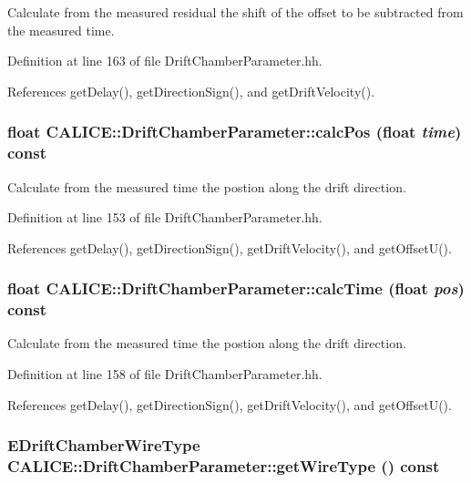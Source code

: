 Calculate from the measured residual the shift of the offset to be subtracted from the measured time. 

Definition at line 163 of file DriftChamberParameter.hh.

References getDelay(), getDirectionSign(), and getDriftVelocity().
\subsubsection[{calcPos}]{\setlength{\rightskip}{0pt plus 5cm}float CALICE::DriftChamberParameter::calcPos (float {\em time}) const\hspace{0.3cm}{\ttfamily  [inline]}}\label{classCALICE_1_1DriftChamberParameter_a7428fac05d35e11805d56bb8dc049f32}


Calculate from the measured time the postion along the drift direction. 

Definition at line 153 of file DriftChamberParameter.hh.

References getDelay(), getDirectionSign(), getDriftVelocity(), and getOffsetU().
\subsubsection[{calcTime}]{\setlength{\rightskip}{0pt plus 5cm}float CALICE::DriftChamberParameter::calcTime (float {\em pos}) const\hspace{0.3cm}{\ttfamily  [inline]}}\label{classCALICE_1_1DriftChamberParameter_a8a345729460750459938502986ff4c27}


Calculate from the measured time the postion along the drift direction. 

Definition at line 158 of file DriftChamberParameter.hh.

References getDelay(), getDirectionSign(), getDriftVelocity(), and getOffsetU().
\subsubsection[{getWireType}]{\setlength{\rightskip}{0pt plus 5cm}EDriftChamberWireType CALICE::DriftChamberParameter::getWireType () const\hspace{0.3cm}{\ttfamily  [inline]}}\label{classCALICE_1_1DriftChamberParameter_a056d3a2b0823518ed1fc3d184488d91a}


